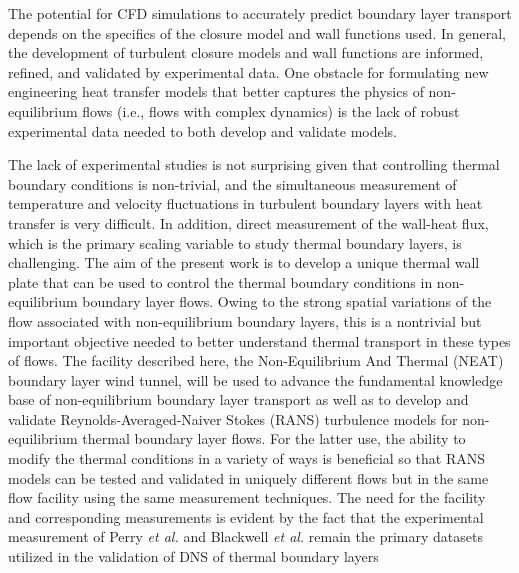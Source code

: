 The potential for CFD simulations to accurately predict boundary layer transport depends on the specifics of the closure model and wall functions used. In general, the development of turbulent closure models and wall functions are informed, refined, and validated by experimental data. One obstacle for formulating new engineering heat transfer models that better captures the physics of non-equilibrium flows (i.e., flows with complex dynamics) is the lack of robust experimental data needed to both develop and validate models.

The lack of experimental studies is not surprising given that controlling thermal boundary conditions is non-trivial, and the simultaneous measurement of temperature and velocity fluctuations in turbulent boundary layers with heat transfer is very difficult. In addition, direct measurement of the wall-heat flux, which is the primary scaling variable to study thermal boundary layers, is challenging. 
The aim of the present work is to develop a unique thermal wall plate that can be used to control the thermal boundary conditions in non-equilibrium boundary layer flows. 
Owing to the strong spatial variations of the flow associated with non-equilibrium boundary layers, this is a nontrivial but important objective needed to better understand thermal transport in these types of flows. 
The facility described here, the Non-Equilibrium And Thermal (NEAT) boundary layer wind tunnel, will be used to advance the fundamental knowledge base of non-equilibrium boundary layer transport as well as to develop and validate Reynolds-Averaged-Naiver Stokes (RANS) turbulence models for non-equilibrium thermal boundary layer flows.   
For the latter use, the ability to modify the thermal conditions in a variety of ways is beneficial so that RANS models can be tested and validated in uniquely different flows but in the same flow facility using the same measurement techniques. The need for the facility and corresponding measurements is evident by the fact that the experimental measurement of Perry \textit{et al.}\cite{Perry1966} and Blackwell \textit{et al.}\cite{Blackwell_1972} remain the primary datasets utilized in the validation of DNS of thermal boundary layers \cite{Araya2012}
